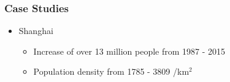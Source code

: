 		\subsubsection{Case Studies}
			\begin{itemize}
				\item Shanghai
				\begin{itemize}
					\item Increase of over 13 million people from 1987 - 2015
					\item Population density from 1785 - 3809 /km$^2$
				\end{itemize}
			\end{itemize}

